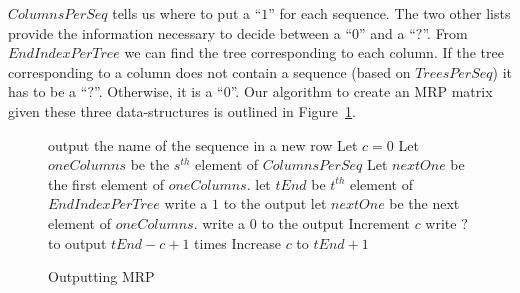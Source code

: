 \documentclass[a4paper,10pt]{article}
\begin{document}
$ColumnsPerSeq$ tells us where to put a ``$1$'' for each sequence. The two
other lists provide the information necessary to decide between a ``$0$'' and a
``$?$''. From $EndIndexPerTree$ we can find the tree corresponding to each
column. If the tree corresponding to a column does not contain a sequence (based
on $TreesPerSeq$) it has to be a ``$?$''. Otherwise, it is a ``$0$''.
Our algorithm to create an MRP matrix given these three data-structures is
outlined in Figure~\ref{fig:alg-out}.

\begin{figure}[htp]
 \centering
\begin{algorithmic}[5]
	\STATE output the name of the sequence in a new row
	\STATE Let $c=0$
	\STATE Let $oneColumns$ be the $s^{th}$ element of $ColumnsPerSeq$
	\STATE Let $nextOne$ be the first element of $oneColumns$.
	  \STATE let $tEnd$ be $t^{th}$ element of $EndIndexPerTree$
		  \STATE write a $1$ to the output
		  \STATE let $nextOne$ be the next element of $oneColumns$.
		\ELSE
		  \STATE write a $0$ to the output
		\ENDIF
		\STATE  Increment $c$
	    \ENDWHILE
	  \ELSE
	    \STATE write $?$ to output $tEnd - c + 1$ times
	    \STATE Increase $c$ to $tEnd+1$
	  \ENDIF
	\ENDFOR
\ENDFOR
\end{algorithmic}
\caption{Outputting MRP}
 \label{fig:alg-out}
\end{figure}
\end{document}
